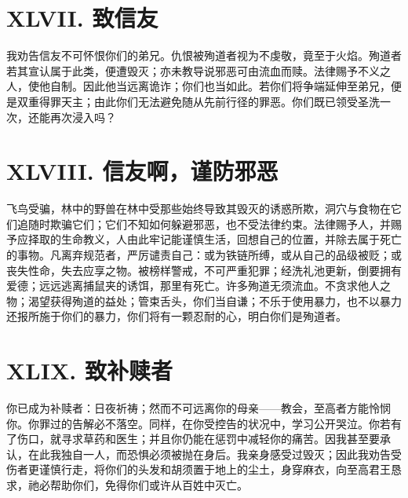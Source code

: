 
\section{XLVII. 致信友}

我劝告信友不可怀恨你们的弟兄。仇恨被殉道者视为不虔敬，竟至于火焰。殉道者若其宣认属于此类，便遭毁灭；亦未教导说邪恶可由流血而赎。法律赐予不义之人，使他自制。因此他当远离诡诈；你们也当如此。若你们将争端延伸至弟兄，便是双重得罪天主；由此你们无法避免随从先前行径的罪恶。你们既已领受圣洗一次，还能再次浸入吗？\par


\section{XLVIII. 信友啊，谨防邪恶}

飞鸟受骗，林中的野兽在林中受那些始终导致其毁灭的诱惑所欺，洞穴与食物在它们追随时欺骗它们；它们不知如何躲避邪恶，也不受法律约束。法律赐予人，并赐予应择取的生命教义，人由此牢记能谨慎生活，回想自己的位置，并除去属于死亡的事物。凡离弃规范者，严厉谴责自己：或为铁链所缚，或从自己的品级被贬；或丧失性命，失去应享之物。被榜样警戒，不可严重犯罪；经洗礼池更新，倒要拥有爱德；远远逃离捕鼠夹的诱饵，那里有死亡。许多殉道无须流血。不贪求他人之物；渴望获得殉道的益处；管束舌头，你们当自谦；不乐于使用暴力，也不以暴力还报所施于你们的暴力，你们将有一颗忍耐的心，明白你们是殉道者。\par


\section{XLIX. 致补赎者}

你已成为补赎者：日夜祈祷；然而不可远离你的母亲——教会，至高者方能怜悯你。你罪过的告解必不落空。同样，在你受控告的状况中，学习公开哭泣。你若有了伤口，就寻求草药和医生；并且你仍能在惩罚中减轻你的痛苦。因我甚至要承认，在此我独自一人，而恐惧必须被抛在身后。我亲身感受过毁灭；因此我劝告受伤者更谨慎行走，将你们的头发和胡须置于地上的尘土，身穿麻衣，向至高君王恳求，祂必帮助你们，免得你们或许从百姓中灭亡。\par



